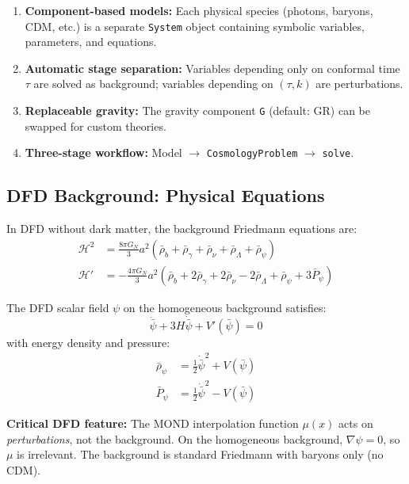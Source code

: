 \documentclass[11pt,a4paper]{article}
\begin{document}
\begin{enumerate}
\item \textbf{Component-based models:} Each physical species (photons, baryons, CDM, etc.) is a separate \texttt{System} object containing symbolic variables, parameters, and equations.
\item \textbf{Automatic stage separation:} Variables depending only on conformal time $\tau$ are solved as background; variables depending on $(\tau, k)$ are perturbations.
\item \textbf{Replaceable gravity:} The gravity component \texttt{G} (default: GR) can be swapped for custom theories.
\item \textbf{Three-stage workflow:} Model $\to$ \texttt{CosmologyProblem} $\to$ \texttt{solve}.
\end{enumerate}

\subsection{DFD Background: Physical Equations}

In DFD without dark matter, the background Friedmann equations are:
\begin{align}
\mathcal{H}^2 &= \frac{8\pi G_N}{3}a^2\left(\bar{\rho}_b + \bar{\rho}_\gamma + \bar{\rho}_\nu + \bar{\rho}_\Lambda + \bar{\rho}_\psi\right) \label{eq:friedmann1}\\
\mathcal{H}' &= -\frac{4\pi G_N}{3}a^2\left(\bar{\rho}_b + 2\bar{\rho}_\gamma + 2\bar{\rho}_\nu - 2\bar{\rho}_\Lambda + \bar{\rho}_\psi + 3\bar{P}_\psi\right) \label{eq:friedmann2}
\end{align}

The DFD scalar field $\psi$ on the homogeneous background satisfies:
\begin{equation}
\ddot{\bar{\psi}} + 3H\dot{\bar{\psi}} + V'(\bar{\psi}) = 0
\label{eq:psi_bg}
\end{equation}
with energy density and pressure:
\begin{align}
\bar{\rho}_\psi &= \frac{1}{2}\dot{\bar{\psi}}^2 + V(\bar{\psi}) \\
\bar{P}_\psi &= \frac{1}{2}\dot{\bar{\psi}}^2 - V(\bar{\psi})
\end{align}

\textbf{Critical DFD feature:} The MOND interpolation function $\mu(x)$ acts on \emph{perturbations}, not the background. On the homogeneous background, $\nabla\psi = 0$, so $\mu$ is irrelevant. The background is standard Friedmann with baryons only (no CDM).
\end{document}

